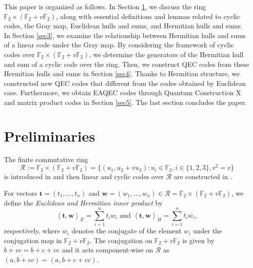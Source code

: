 \documentclass[pdflatex,sn-mathphys-num]{sn-jnl}%
\theoremstyle{thmstyleone}%
\theoremstyle{thmstyletwo}%
\theoremstyle{thmstylethree}%
\begin{document}
This paper is organized as follows. In Section \ref{sec2}, we discuss the ring $\mathbb{F}_2\times(\mathbb{F}_2+v\mathbb{F}_2)$, along with essential definitions and lemmas related to cyclic codes, the Gray map, Euclidean hulls and sums, and Hermitian hulls and sums. In Section \ref{sec3}, we examine the relationship between Hermitian hulls and sums of a linear code under the Gray map. By considering the framework of cyclic codes over $\mathbb{F}_2\times(\mathbb{F}_2+v\mathbb{F}_2)$, we determine the generators of the Hermitian hull and sum of a cyclic code over the ring. Then, we construct QEC codes from these Hermitian hulls and sums in Section \ref{sec4}. Thanks to Hermitian structure, we constructed new QEC codes that different from the codes obtained by Euclidean case. Furthermore, we obtain EAQEC codes through Quantum Construction X and matrix product codes in Section \ref{sec5}. The last section concludes the paper.


\section{Preliminaries}
\label{sec2}
The finite commutative ring
\begin{equation*}
\mathcal{R}:=\mathbb{F}_2\times(\mathbb{F}_2+v\mathbb{F}_2)=\{(u_1,
u_2+vu_3) : u_i\in\mathbb{F}_2, i\in\{1,2,3\}, v^2=v\}
\end{equation*}
is introduced in \cite{F2ring} and then linear and cyclic codes over $\mathcal{R}$ are constructed in \cite{F2ring,cyclicF2,selfdualcodeinring,eaqecinring}.

\noindent For vectors $\mathbf{t}=(t_{1},\dots ,t_{n})$ and $\mathbf{w}=(w_{1},\dots ,w_{n})\in \mathcal{R}=\mathbb{F}_{2}\times (\mathbb{F}_{2}+v\mathbb{F}_{2})$, we define the \emph{Euclidean and} \emph{Hermitian inner
product} by
\begin{equation*}
\left\langle \mathbf{t},\mathbf{w}\right\rangle _{E}=\sum_{i=1}^{n}t_{i}w_{i}
\text{ and }\left\langle \mathbf{t},\mathbf{w}\right\rangle
_{H}=\sum_{i=1}^{n}t_{i}\overline{w_{i}},
\end{equation*}
respectively, where $\overline{w_{i}}$ denotes the conjugate of the element $w_{i}$ under the conjugation map in $\mathbb{F}_{2}+v\mathbb{F}_{2}$. The
conjugation on $\mathbb{F}_{2}+v\mathbb{F}_{2}$ is given by $\overline{b+vc}=b+c+vc$ and it acts component-wise on $\mathcal{R}$ as $\overline{(a,b+vc)}
=(a,b+c+vc).$
\end{document}
